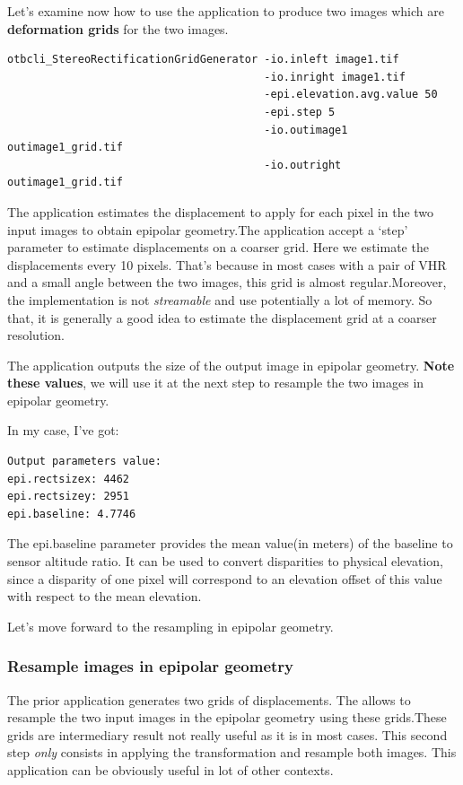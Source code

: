 Let's examine now how to use the 
application to produce two images which are \textbf{deformation grids} for
the two images.

\begin{verbatim}
otbcli_StereoRectificationGridGenerator -io.inleft image1.tif
                                        -io.inright image1.tif
                                        -epi.elevation.avg.value 50
                                        -epi.step 5
                                        -io.outimage1 outimage1_grid.tif
                                        -io.outright outimage1_grid.tif
\end{verbatim}

The application estimates the displacement to apply for each pixel in the two
input images to obtain epipolar geometry.The application
accept a `step' parameter to estimate displacements on a coarser grid. Here we
estimate the displacements every 10 pixels. That's because in most cases with a
pair of VHR and a small angle between the two images, this grid is almost
regular.Moreover, the implementation is not \textit{streamable} and use potentially a
lot of memory. So that, it is generally a good idea to estimate the displacement
grid at a coarser resolution.

The application outputs the size of the output image in epipolar
geometry. \textbf{Note these values}, we will use it at the next step to
resample the two images in epipolar geometry.

In my case, I've got:

\begin{verbatim}
Output parameters value:
epi.rectsizex: 4462
epi.rectsizey: 2951
epi.baseline: 4.7746
\end{verbatim}

The epi.baseline parameter provides the mean value(in meters) of the
baseline to sensor altitude ratio. It can be used to convert disparities to
physical elevation, since a disparity of one pixel will correspond to an
elevation offset of this value with respect to the mean elevation.

Let's move forward to the resampling in epipolar geometry.

\subsubsection{Resample images in epipolar geometry}

The prior application generates two grids of
displacements. The  allows to resample the
two input images in the epipolar geometry using these grids.These grids are
intermediary result not really useful as it is in most cases. This second
step \textit{only} consists in applying the transformation and resample both
images.  This application can be obviously useful in lot of other contexts.

